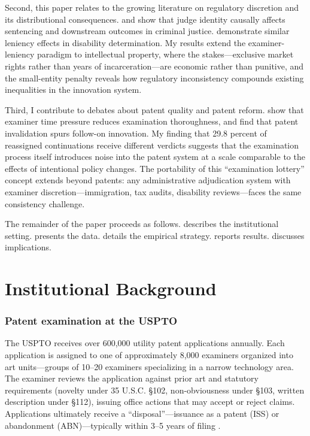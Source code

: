 \documentclass[12pt]{article}
\begin{document}
Second, this paper relates to the growing literature on regulatory discretion and its distributional consequences. \citet{kling2006incarceration} and \citet{dobbie2018effects} show that judge identity causally affects sentencing and downstream outcomes in criminal justice. \citet{maestas2013disability} demonstrate similar leniency effects in disability determination. My results extend the examiner-leniency paradigm to intellectual property, where the stakes---exclusive market rights rather than years of incarceration---are economic rather than punitive, and the small-entity penalty reveals how regulatory inconsistency compounds existing inequalities in the innovation system.

Third, I contribute to debates about patent quality and patent reform. \citet{frakes2017patent} show that examiner time pressure reduces examination thoroughness, and \citet{galasso2015patents} find that patent invalidation spurs follow-on innovation. My finding that 29.8 percent of reassigned continuations receive different verdicts suggests that the examination process itself introduces noise into the patent system at a scale comparable to the effects of intentional policy changes. The portability of this ``examination lottery'' concept extends beyond patents: any administrative adjudication system with examiner discretion---immigration, tax audits, disability reviews---faces the same consistency challenge.

The remainder of the paper proceeds as follows.  describes the institutional setting.  presents the data.  details the empirical strategy.  reports results.  discusses implications.


\section{Institutional Background}
\label{sec:background}

\subsubsection*{Patent examination at the USPTO} The USPTO receives over 600,000 utility patent applications annually. Each application is assigned to one of approximately 8,000 examiners organized into art units---groups of 10--20 examiners specializing in a narrow technology area. The examiner reviews the application against prior art and statutory requirements (novelty under 35 U.S.C. \S 102, non-obviousness under \S 103, written description under \S 112), issuing office actions that may accept or reject claims. Applications ultimately receive a ``disposal''---issuance as a patent (ISS) or abandonment (ABN)---typically within 3--5 years of filing \citep{frakes2017patent}.
\end{document}
